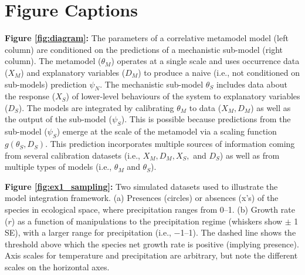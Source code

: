 \documentclass[11pt]{article}
\begin{document}
%
%

\renewcommand\refname{Literature Cited}
{}




%
%

\newpage
\section*{Figure Captions}


\begin{flushleft}

\textbf{Figure \ref{fig:diagram}:}
	The parameters of a correlative metamodel model (left column) are conditioned on the predictions of a mechanistic sub-model (right column).
	The metamodel ($\theta_M$) operates at a single scale and uses occurrence data (\(X_M\)) and explanatory variables ($D_M$) to produce a naive (i.e., not conditioned on sub-models) prediction $\psi_N$.
	The mechanistic sub-model \(\theta_S\) includes data about the response (\(X_S\)) of lower-level behaviours of the system to explanatory variables ($D_S$). 
	The models are integrated by calibrating $\theta_M$ to data ($X_M, D_M$) as well as the output of the sub-model ($\psi_S$). 
	This is possible because predictions from the sub-model ($\psi_S$) emerge at the scale of the metamodel via a scaling function \(g(\theta_S, D_S)\).
	This prediction incorporates multiple sources of information coming from several calibration datasets (i.e., $X_M, D_M, X_S, $ and $D_S$) as well as from multiple types of models (i.e., $\theta_M$ and $\theta_S$).


\textbf{Figure \ref{fig:ex1_sampling}:}
	Two simulated datasets used to illustrate the model integration framework.
	(a) Presences (circles) or absences (x's) of the species in ecological space, where precipitation ranges from 0--1.
	(b) Growth rate ($r$) as a function of manipulations to the precipitation regime (whiskers show $\pm$ 1 SE), with a larger range for precipitation (i.e., \(-\)1--1).
	The dashed line shows the threshold above which the species net growth rate is positive (implying presence).
	Axis scales for temperature and precipitation are arbitrary, but note the different scales on the horizontal axes.
	

\end{flushleft}
\end{document}
